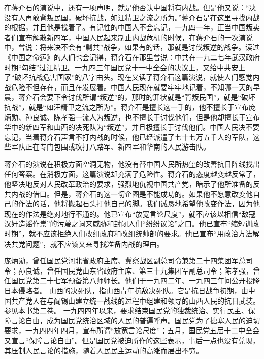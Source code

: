 在蒋介石的演说中，还有一项声明，就是他否认中国将有内战。但是他又说：“决没有人再敢背叛民国，破坏抗战，如汪精卫之流之所为。”蒋介石是在这里寻找内战的根据，并且他是找着了。有记性的中国人不会忘记，一九四一年，正当中国叛卖者们宣布解散新四军，中国人民起来制止内战危机的时候，在蒋介石的一次演说中，曾说：将来决不会有“剿共”战争，如果有的话，那就是讨伐叛逆的战争。读过《中国之命运》的人们也会记得，蒋介石在那里曾说：中共在一九二七年武汉政府时期“勾结”过汪精卫。一九四三年国民党十一中全会的决议上，又给中共安上了“破坏抗战危害国家”的八字由头。现在又读了蒋介石这篇演说，就使人们感觉内战危险不但存在，而且在发展着。中国人民现在就要牢牢地记着，不知哪一天的早晨，蒋介石会要下令讨伐所谓“叛逆”的，那时的罪状就是“背叛民国”，就是“破坏抗战”，就是“如汪精卫之流之所为”。蒋介石是擅长这一手的，他不擅长于宣布庞炳勋、孙良诚、陈孝强一流人为叛逆，也不擅长于讨伐他们，但是他却擅长于宣布华中的新四军和山西的决死队为“叛逆”，并且极擅长于讨伐他们。中国人民决不要忘记，当着蒋介石声言不打内战的时候，他已经派遣了七十七万五千人的军队，这些军队正在专门包围或攻打八路军、新四军和华南的人民游击队。

蒋介石的演说在积极方面空洞无物，他没有替中国人民所热望的改善抗日阵线找出任何答案。在消极方面，这篇演说却充满了危险性。蒋介石的态度越变越反常了，他坚决地反对人民改革政治的要求，强烈地仇视中国共产党，暗示了他所准备的反共内战的借口。但是，蒋介石的这一切企图是不能成功的。如果他不愿意改变他自己的作法的话，他将搬起石头打他自己的脚。我们诚恳地希望他改变作法，因为他现在的作法是绝对地行不通的。他已宣布“放宽言论尺度”，就不应该以相信“敌寇汉奸造谣作祟”的污蔑之词来威胁和封闭人们“纷纷议论”之口。他已宣布“缩短训政时期”，就不应该拒绝人们改组政府和改组统帅部的要求。他已宣布“用政治方法解决共党问题”，就不应该又来寻找准备内战的理由。


\begin{maonote}
庞炳勋，曾任国民党河北省政府主席、冀察战区副总司令兼第二十四集团军总司令；孙良诚，曾任国民党山东省政府主席、第三十九集团军副总司令；陈孝强，曾任国民党第二十七军预备第八师师长。他们于一九四二年、一九四三年间公开投降日本侵略者。
山西的决死队，指山西青年抗敌决死队。它是抗日战争初期，由中国共产党人在与阎锡山建立统一战线的过程中组建和领导的山西人民的抗日武装。参见本书第二卷。
一九四四年以来，要求结束国民党的独裁统治、实行民主、保障言论自由，成为国民党统治区域的人民的普遍呼声。国民党为了搪塞人民的迫切要求，一九四四年四月，宣布所谓“放宽言论尺度”；五月，国民党五届十二中全会又宣言“保障言论自由”。但是国民党被迫所作的这些表示，事后一点也没有兑现，其压制人民言论的措施，随着人民民主运动的高涨而层出不穷。
\end{maonote}
